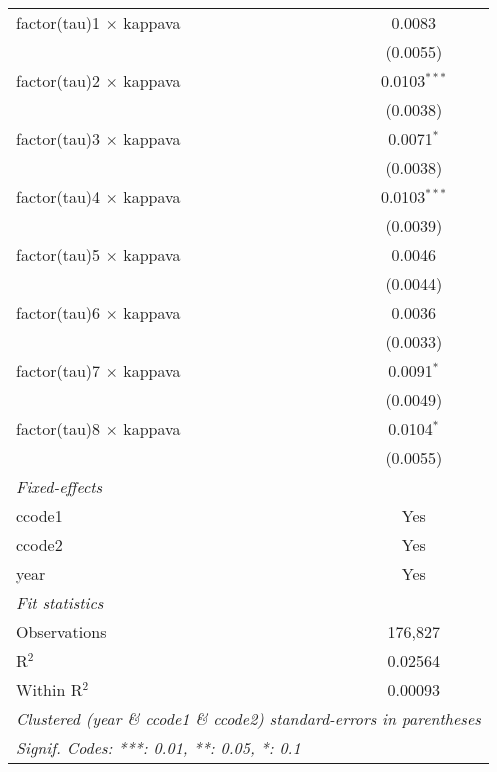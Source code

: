 \begin{tabular}{lc}
   factor(tau)1 $\times$ kappava   & 0.0083\\   
                                   & (0.0055)\\   
   factor(tau)2 $\times$ kappava   & 0.0103$^{***}$\\   
                                   & (0.0038)\\   
   factor(tau)3 $\times$ kappava   & 0.0071$^{*}$\\   
                                   & (0.0038)\\   
   factor(tau)4 $\times$ kappava   & 0.0103$^{***}$\\   
                                   & (0.0039)\\   
   factor(tau)5 $\times$ kappava   & 0.0046\\   
                                   & (0.0044)\\   
   factor(tau)6 $\times$ kappava   & 0.0036\\   
                                   & (0.0033)\\   
   factor(tau)7 $\times$ kappava   & 0.0091$^{*}$\\   
                                   & (0.0049)\\   
   factor(tau)8 $\times$ kappava   & 0.0104$^{*}$\\   
                                   & (0.0055)\\   
   \midrule
   \emph{Fixed-effects}\\
   ccode1                          & Yes\\  
   ccode2                          & Yes\\  
   year                            & Yes\\  
   \midrule
   \emph{Fit statistics}\\
   Observations                    & 176,827\\  
   R$^2$                           & 0.02564\\  
   Within R$^2$                    & 0.00093\\  
   \midrule \midrule
   \multicolumn{2}{l}{\emph{Clustered (year \& ccode1 \& ccode2) standard-errors in parentheses}}\\
   \multicolumn{2}{l}{\emph{Signif. Codes: ***: 0.01, **: 0.05, *: 0.1}}\\
\end{tabular}
\par\endgroup



